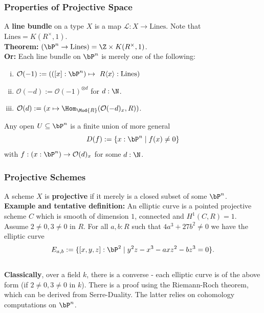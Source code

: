 \documentclass{beamer}
\begin{document}
\begin{frame}
  \frametitle{Properties of Projective Space}
  A \textbf{line bundle} on a type $X$ is a map $\mathcal L:X\to \mathrm{Lines}$.
  Note that $\mathrm{Lines}=K(R^\times,1)$.\\
  \vspace{4mm}
  \pause
  \textbf{Theorem:} $(\bP^n\to \mathrm{Lines}) = \Z\times K(R^\times,1)$. \\
  \pause
  \textbf{Or:} Each line bundle on $\bP^n$ is merely one of the following:
  \begin{enumerate}[(i)]
  \item $\mathcal O(-1):=(([x] : \bP^n) \mapsto \text{ $R\langle x\rangle : \mathrm{Lines}$})$
  \item $\mathcal O(-d):=\mathcal O(-1)^{\otimes d}$ for $d:\N$.
  \item $\mathcal O(d):=(x\mapsto \Hom_{\Mod{R}}(\mathcal O(-d)_x,R))$.
  \end{enumerate}
  \vspace{4mm}
  \pause
  Any open $U\subseteq \bP^n$ is a finite union of more general
  \[ D(f):=\{x:\bP^n\mid f(x)\neq 0 \}\]
  with $f:(x:\bP^n)\to \mathcal O(d)_x$ for some $d:\N$.
\end{frame}

\begin{frame}
  \frametitle{Projective Schemes}
  \pause
  A scheme $X$ is \textbf{projective} if it merely is a closed subset of some $\bP^n$. \\
  \vspace{4mm}
  \textbf{Example and tentative definition:}
  An elliptic curve is a pointed projective scheme $C$
  which is smooth of dimension $1$, connected and $H^1(C,R)=1$.
  \pause
  Assume $2\neq 0,3\neq 0$ in $R$.
  For all $a,b:R$ such that $4a^3+27b^2\neq 0$ we have the elliptic curve
  \[ E_{a,b}:=\{ [x,y,z] :\bP^2\mid y^2z-x^3-axz^2-bz^3=0 \}.\] \\
  \pause
  \textbf{Classically}, over a field $k$, there is a converse - each elliptic curve is of the above form (if $2\neq 0, 3\neq 0$ in $k$).
  \pause
  There is a proof using the Riemann-Roch theorem, which can be derived from Serre-Duality.
  The latter relies on cohomology computations on $\bP^n$.
\end{frame}
\end{document}
